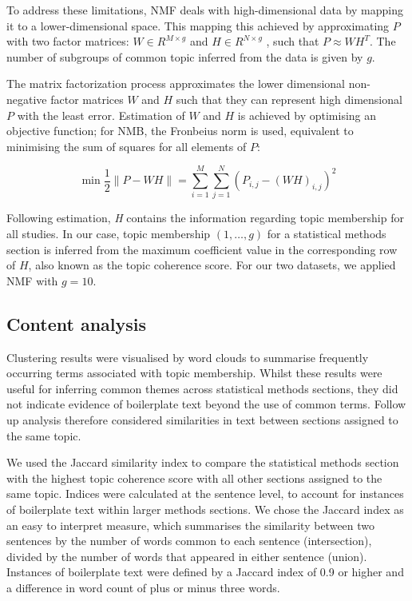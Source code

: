 \documentclass[12pt]{article}
\begin{document}
To address these limitations, NMF deals with high-dimensional data by
mapping it to a lower-dimensional space. This mapping this achieved by
approximating \(P\) with two factor matrices: \(W \in R^{M \times g}\)
and \(H \in R ^{N \times g}\) \citep{aggarwal2012mining}, such that
\(P \approx WH^{T}\). The number of subgroups of common topic inferred
from the data is given by \(g\).

The matrix factorization process approximates the lower dimensional
non-negative factor matrices \(W\) and \(H\) such that they can
represent high dimensional \(P\) with the least error. Estimation of
\(W\) and \(H\) is achieved by optimising an objective function; for
NMB, the Fronbeius norm is used, equivalent to minimising the sum of
squares for all elements of \(P\):

\begin{equation}
\label{eq:NMFobjectivefn}
\min \frac{1}{2}\|P - WH\|= \sum _{i=1}^{M}\sum _{j=1}^{N} \left(  P_{i,j} -\left(WH \right)_{i,j} \right)^{2}
\end{equation}

Following estimation, \textit{H} contains the information regarding
topic membership for all studies. In our case, topic membership
\((1,\ldots,g)\) for a statistical methods section is inferred from the
maximum coefficient value in the corresponding row of \(H\), also known
as the topic coherence score. For our two datasets, we applied NMF with
\(g=10\).

\subsection{Content analysis}

Clustering results were visualised by word clouds to summarise
frequently occurring terms associated with topic membership. Whilst
these results were useful for inferring common themes across statistical
methods sections, they did not indicate evidence of boilerplate text
beyond the use of common terms. Follow up analysis therefore considered
similarities in text between sections assigned to the same topic.

We used the Jaccard similarity index to compare the statistical methods
section with the highest topic coherence score with all other sections
assigned to the same topic. Indices were calculated at the sentence
level, to account for instances of boilerplate text within larger
methods sections. We chose the Jaccard index as an easy to interpret
measure, which summarises the similarity between two sentences by the
number of words common to each sentence (intersection), divided by the
number of words that appeared in either sentence (union). Instances of
boilerplate text were defined by a Jaccard index of 0.9 or higher and a
difference in word count of plus or minus three words.
\end{document}
